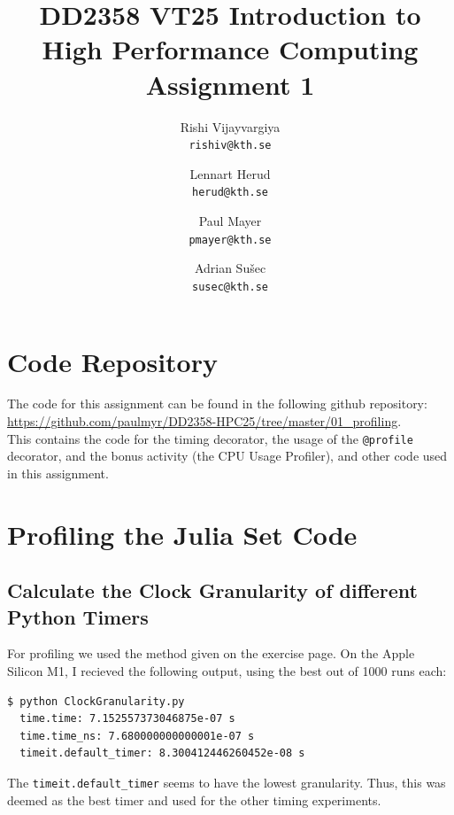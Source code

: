 \documentclass[a4paper,12pt]{article}
\title{
  \normalsize{DD2358 VT25 Introduction to}\\
  \normalsize{High Performance Computing}\\
  \large{Assignment 1}\\
}
\author{
  \small Rishi Vijayvargiya\\[-0.75ex]
  \scriptsize\texttt{rishiv@kth.se}
  \and
  \small Lennart Herud\\[-0.75ex]
  \scriptsize\texttt{herud@kth.se}
  \and
  \small Paul Mayer\\[-0.75ex]
  \scriptsize\texttt{pmayer@kth.se}
  \and
  \small Adrian Sušec\\[-0.75ex]
  \scriptsize\texttt{susec@kth.se}
}
\date{}
\begin{document}
\maketitle
\thispagestyle{firstpagestyle}


\vspace{1em}

%

%

\section{Code Repository}
The code for this assignment can be found in the following github repository: \url{https://github.com/paulmyr/DD2358-HPC25/tree/master/01_profiling}. \\

This contains the code for the timing decorator, the usage of the \verb|@profile| decorator, and the bonus activity (the CPU Usage Profiler), and other code used in this assignment.

\section{Profiling the Julia Set Code}
\subsection{Calculate the Clock Granularity of different Python Timers}
For profiling we used the method given on the exercise page.
On the Apple Silicon M1, I recieved the following output, using the best out of 1000 runs each:
\begin{lstlisting}[language=bash,basicstyle=\ttfamily]
  $ python ClockGranularity.py
  time.time: 7.152557373046875e-07 s
  time.time_ns: 7.680000000000001e-07 s
  timeit.default_timer: 8.300412446260452e-08 s
\end{lstlisting}
The \verb|timeit.default_timer| seems to have the lowest granularity. Thus, this was deemed as the best timer and used for the other timing experiments. 
\end{document}
